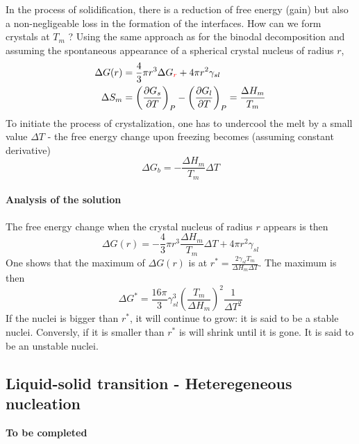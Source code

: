 \documentclass[../phys-f308.tex]{subfiles}
\begin{document}
    In the process of solidification, there is a reduction of free energy (gain) but also a non-negligeable loss in the formation of the interfaces. How can we form crystals at $T_m$ ? Using the same approach as for the binodal decomposition and assuming the spontaneous appearance of a spherical crystal nucleus of radius $r$,
    \begin{align}
        \Delta G(r) &= \frac{4}{3}\pi r^3\Delta G_{\color{red}r\color{black}}+4\pi r^2\gamma_{sl}\\
        \Delta S_m &= \left(\frac{\partial G_s}{\partial T}\right)_{P} - \left(\frac{\partial G_l}{\partial T}\right)_P = \frac{\Delta H_m}{T_m}
    \end{align}
    To initiate the process of crystalization, one has to undercool the melt by a small value $\Delta T$ - the free energy change upon freezing becomes (assuming constant derivative)
    \begin{equation}
        \Delta G_b = -\frac{\Delta H_m}{T_m}\Delta T
    \end{equation}
    \paragraph{Analysis of the solution}
    The free energy change when the crystal nucleus of radius $r$ appears is then
    \begin{equation}
        \Delta G(r) = -\frac{4}{3}\pi r^3\frac{\Delta H_m}{T_m}\Delta T+4\pi r^2\gamma_{sl}
    \end{equation}
    One shows that the maximum of $\Delta G(r)$ is at $r^* = \frac{2\gamma_{sl}T_m}{\Delta H_m\Delta T}$. The maximum is then
    \begin{equation}
        \Delta G^* = \frac{16\pi}{3}\gamma_{sl}^3\left(\frac{T_m}{\Delta H_m}\right)^2\frac{1}{\Delta T^2}
    \end{equation}
    If the nuclei is bigger than $r^*$, it will continue to grow: it is said to be a stable nuclei. Conversly, if it is smaller than $r^*$ is will shrink until it is gone. It is said to be an unstable nuclei.

    \subsection{Liquid-solid transition - Heteregeneous nucleation}

    \color{red}\textbf{To be completed}\color{black}
\end{document}
